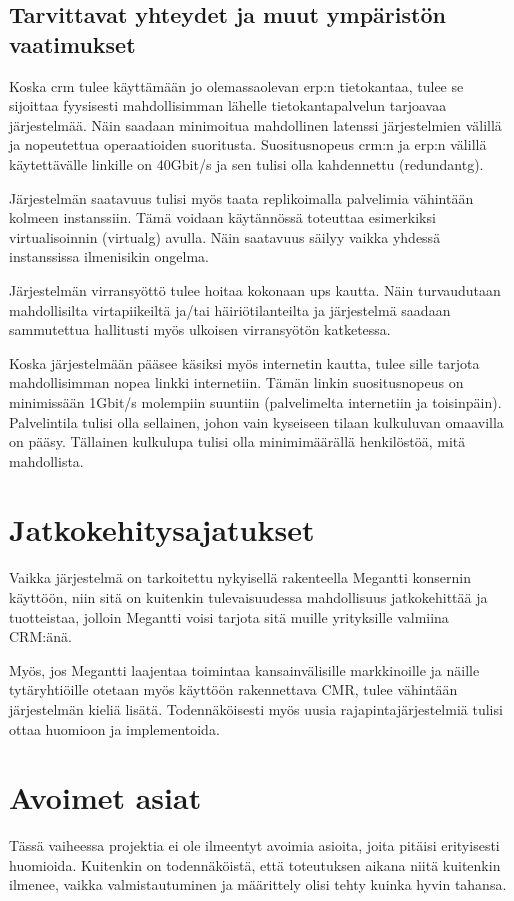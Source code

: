     \subsection{Tarvittavat yhteydet ja muut ympäristön vaatimukset}  %
        Koska \gls{crm} tulee käyttämään jo olemassaolevan \gls{erp}:n tietokantaa, tulee se sijoittaa fyysisesti mahdollisimman lähelle tietokantapalvelun
        tarjoavaa järjestelmää. Näin saadaan minimoitua mahdollinen latenssi järjestelmien välillä ja nopeutettua operaatioiden suoritusta. Suositusnopeus 
        \gls{crm}:n ja \gls{erp}:n välillä käytettävälle linkille on 40Gbit/s ja sen tulisi olla kahdennettu (\gls{redundantg}). 

        Järjestelmän saatavuus tulisi myös taata replikoimalla palvelimia vähintään kolmeen instanssiin. Tämä voidaan käytännössä toteuttaa esimerkiksi virtualisoinnin 
        (\gls{virtualg}) avulla. Näin saatavuus säilyy vaikka yhdessä instanssissa ilmenisikin ongelma. 
        
        Järjestelmän virransyöttö tulee hoitaa kokonaan \gls{ups} kautta. Näin turvaudutaan mahdollisilta virtapiikeiltä ja/tai häiriötilanteilta ja järjestelmä saadaan
        sammutettua hallitusti myös ulkoisen virransyötön katketessa. 
        
        Koska järjestelmään pääsee käsiksi myös internetin kautta, tulee sille tarjota mahdollisimman nopea linkki internetiin. Tämän linkin suositusnopeus on minimissään 
        1Gbit/s molempiin suuntiin (palvelimelta internetiin ja toisinpäin). 
        Palvelintila tulisi olla sellainen, johon vain kyseiseen tilaan kulkuluvan omaavilla on pääsy. Tällainen kulkulupa tulisi olla minimimäärällä henkilöstöä, mitä mahdollista. 

\section{Jatkokehitysajatukset}     %

    Vaikka järjestelmä on tarkoitettu nykyisellä rakenteella Megantti konsernin käyttöön, niin sitä on kuitenkin tulevaisuudessa
    mahdollisuus jatkokehittää ja tuotteistaa, jolloin Megantti voisi tarjota sitä muille yrityksille valmiina CRM:änä.

    Myös, jos Megantti laajentaa toimintaa kansainvälisille markkinoille ja näille tytäryhtiöille otetaan myös käyttöön rakennettava
    CMR, tulee vähintään järjestelmän kieliä lisätä. Todennäköisesti myös uusia rajapintajärjestelmiä tulisi ottaa huomioon ja implementoida.

\section{Avoimet asiat}     %

    Tässä vaiheessa projektia ei ole ilmeentyt avoimia asioita, joita pitäisi erityisesti huomioida. Kuitenkin on todennäköistä, että toteutuksen aikana niitä kuitenkin
    ilmenee, vaikka valmistautuminen ja määrittely olisi tehty kuinka hyvin tahansa.




   
